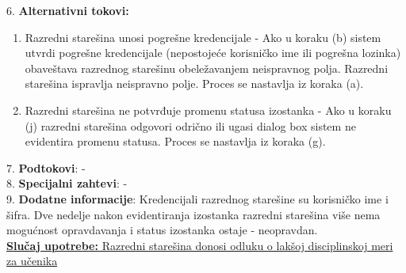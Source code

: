 \documentclass{article}
\begin{document}
6. \textbf{Alternativni tokovi:}
\begin{enumerate} [label=(\roman*)]
\item Razredni starešina unosi pogrešne kredencijale - Ako u koraku (b) sistem utvrdi pogrešne kredencijale (nepostojeće korisničko ime ili pogrešna lozinka) obaveštava razrednog starešinu obeležavanjem neispravnog polja. Razredni starešina ispravlja neispravno polje. Proces se nastavlja iz koraka (a).
\item Razredni starešina ne potvrđuje promenu statusa izostanka - Ako u koraku (j) razredni starešina odgovori odrično ili ugasi dialog box sistem ne evidentira promenu statusa. Proces se nastavlja iz koraka (g). 
\end{enumerate}

7. \textbf{Podtokovi}: - \\

8. \textbf{Specijalni zahtevi}: - \\

9. \textbf{Dodatne informacije}: Kredencijali razrednog starešine su korisničko ime i šifra. Dve nedelje nakon evidentiranja izostanka razredni starešina više nema mogućnost opravdavanja i status izostanka ostaje - neopravdan.\\



\underline{\textbf{Slučaj upotrebe:} Razredni starešina donosi odluku o lakšoj disciplinskoj meri za učenika} \\
\end{document}
